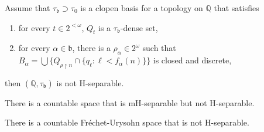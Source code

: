 \documentclass[10pt,a4paper]{amsart}
\begin{document}
\begin{lemma}  Assume that $\tau_{\mathfrak b}\supset \tau_0$
is a clopen basis\label{notH} for a topology on $\mathbb Q$ that satisfies
\begin{enumerate}
\item  for every $t\in 2^{<\omega}$, $Q_t$ is a $\tau_{\mathfrak b}$-dense
 set,
 \item for every $\alpha\in \mathfrak b$, there is a $\rho_\alpha\in 2^\omega$
 such that $B_\alpha = \bigcup\{
  Q_{\rho\restriction n}\cap \{q_\ell : \ell < f_\alpha(n) \}\}$ 
  is closed and discrete,
\end{enumerate}
then $(\mathbb Q, \tau_{\mathfrak b})$ is not H-separable.
\end{lemma}

\begin{theorem}
There is a countable space that is mH-separable\label{justwH}
but not H-separable.
\end{theorem}

\begin{theorem}[$\mathfrak p = \mathfrak b$]
There is a countable Fr\'echet-Urysohn space that is
 not H-separable.
\end{theorem}
\end{document}
